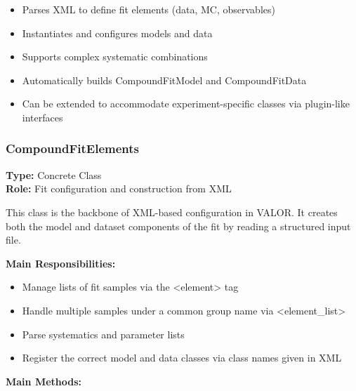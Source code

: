 \begin{itemize}
  \item Parses XML to define fit elements (data, MC, observables)
  \item Instantiates and configures models and data
  \item Supports complex systematic combinations
  \item Automatically builds {\color{cadmiumgreen} CompoundFitModel} and {\color{cadmiumgreen} CompoundFitData}
  \item Can be extended to accommodate experiment-specific classes via plugin-like interfaces
\end{itemize}

\vspace{1em}
\subsubsection*{\color{cadmiumgreen}\bf CompoundFitElements}

\textbf{Type:} Concrete Class \\
\textbf{Role:} Fit configuration and construction from XML

This class is the backbone of XML-based configuration in VALOR. It creates both the model and dataset components of the fit by reading a structured input file.

\vspace{0.5em}
\noindent\textbf{Main Responsibilities:}

\begin{itemize}
  \item Manage lists of fit samples via the {\color{amber}<element>} tag
  \item Handle multiple samples under a common group name via {\color{amber}<element\_list>}
  \item Parse systematics and parameter lists
  \item Register the correct model and data classes via class names given in XML
\end{itemize}

\vspace{0.5em}
\noindent\textbf{Main Methods:}

